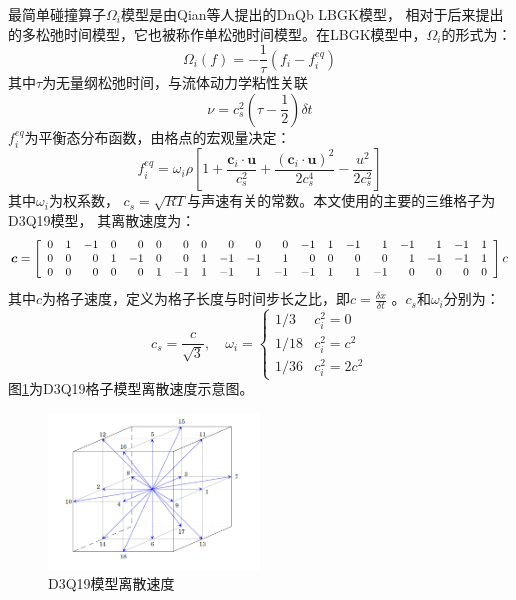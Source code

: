 最简单碰撞算子$\Omega_i$模型是由Qian等人提出的DnQb LBGK模型，
相对于后来提出的多松弛时间模型，它也被称作单松弛时间模型。在LBGK模型中，$\Omega_i$的形式为：
\begin{equation}
 \Omega_i(f) = -\frac{1}{\tau}\left( f_i  - f_i^{eq}\right)
  \label{lbgk}
\end{equation}
其中$\tau$为无量纲松弛时间，与流体动力学粘性关联
\begin{equation}
  \nu = c_s^2(\tau-\frac{1}{2})\delta t
  \label{nu_tau}
  \end{equation}
$f_i^{eq}$为平衡态分布函数，由格点的宏观量决定：
\begin{equation}
  f_i^{eq} = \omega_i \rho 
  \left[ 1 
    + \frac{\bm c_i \cdot \bm u}{c_s^2}
    + \frac{(\bm c_i \cdot \bm u)^2}{2c_s^4}
    - \frac{u^2}{2c_s^2}
    \right]
  \label{feq}
\end{equation}
其中$\omega_i$为权系数， $c_s=\sqrt{RT}$与声速有关的常数。本文使用的主要的三维格子为D3Q19模型，
其离散速度为：
\begin{displaymath}
\small
  \bm c =  \left[\begin{array}{*{19}{r}}
 0 & 1 & -1 & 0 & 0 & 0 & 0 & 0 & 0 & 0 & 0 & -1 & 1 & -1 & 1 & -1 & 1 & -1 & 1 \\
 0 & 0 & 0 & 1 & -1 & 0 & 0 & 1 & -1 & -1 & 1 & 0 & 0 & 0 & 0 & 1 & -1 & -1 & 1 \\
 0 & 0 & 0 & 0 & 0 & 1 & -1 & 1 & -1 & 1 & -1 & -1 & 1 & 1 & -1 & 0 & 0 & 0 & 0
\end{array}\right] c
\end{displaymath}
其中$c$为格子速度，定义为格子长度与时间步长之比，即$c=\frac{\delta x}{\delta t}$
。$c_s$和$\omega_i$分别为：
\begin{displaymath}
c_s = \frac{c}{\sqrt{3}}, \quad
\omega_i =\left\{ \begin{array}{ll}
1/3 & c_i^2=0 \\
1/18 & c_i^2=c^2 \\
1/36 & c_i^2=2c^2 
\end{array}\right.
\end{displaymath}
图\ref{fig:d3q19}为D3Q19格子模型离散速度示意图。

\begin{figure}[htpb]
  \centering
  \includegraphics[width=0.5\textwidth]{img/d3q19}
  \caption{D3Q19模型离散速度}
  \label{fig:d3q19}
\end{figure}






